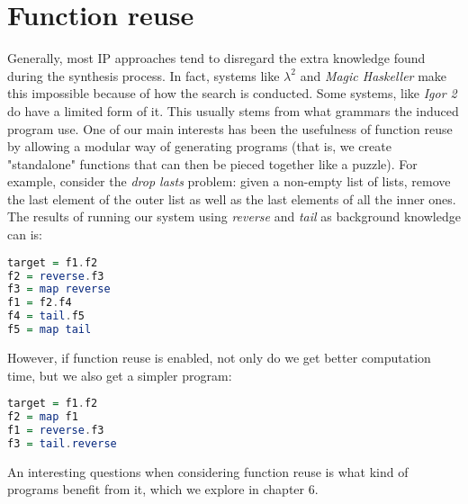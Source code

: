\section{Function reuse}
\indent \indent Generally, most IP approaches tend to disregard the extra knowledge found during the synthesis process. In fact, systems like \textit{$\lambda^{2}$} and \textit{Magic Haskeller} make this impossible because of how the search is conducted. Some systems, like \textit{Igor 2} do have a limited form of it. This usually stems from what grammars the induced program use. One of our main interests has been the usefulness of function reuse by allowing a modular way of generating programs (that is, we create "standalone" functions that can then be pieced together like a puzzle). For example, consider the \textit{drop lasts} problem: given a non-empty list of lists, remove the last element of the outer list as well as the last elements of all the inner ones. The results of running our system using \textit{reverse} and \textit{tail} as background knowledge can is:

\begin{exam}
\begin{lstlisting}[language=Haskell]
target = f1.f2 
f2 = reverse.f3
f3 = map reverse 
f1 = f2.f4   
f4 = tail.f5
f5 = map tail
\end{lstlisting}
\end{exam}

However, if function reuse is enabled, not only do we get better computation time, but we also get a simpler program:

\begin{exam}
\begin{lstlisting}[language=Haskell]
target = f1.f2 
f2 = map f1
f1 = reverse.f3
f3 = tail.reverse
\end{lstlisting}
\end{exam}

An interesting questions when considering function reuse is what kind of programs benefit from it, which we explore in chapter 6. 